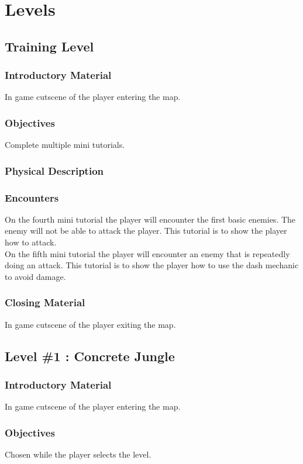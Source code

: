 \documentclass{article}
\begin{document}
\section{Levels}
\label{sec:orga2f626e}
\subsection{Training Level}
\label{sec:orgd1a4e93}
\subsubsection{Introductory Material}
\label{sec:orgfb2b0a7}
In game cutscene of the player entering the map.
\subsubsection{Objectives}
\label{sec:orgf2ca4cb}
Complete multiple mini tutorials.
\subsubsection{Physical Description}
\label{sec:orgf494331}
\subsubsection{Encounters}
\label{sec:orgcc0434e}
On the fourth mini tutorial the player will encounter the first basic enemies.
The enemy will not be able to attack the player.
This tutorial is to show the player how to attack. \\[0pt]

On the fifth mini tutorial the player will encounter an enemy that is repeatedly doing an attack.
This tutorial is to show the player how to use the dash mechanic to avoid damage.
\subsubsection{Closing Material}
\label{sec:orgfec688b}
In game cutscene of the player exiting the map.
\subsection{Level \#1 : Concrete Jungle}
\label{sec:org6152593}
\subsubsection{Introductory Material}
\label{sec:orga3892c1}
In game cutscene of the player entering the map.
\subsubsection{Objectives}
\label{sec:orgf8eb64c}
Chosen while the player selects the level.
\end{document}
